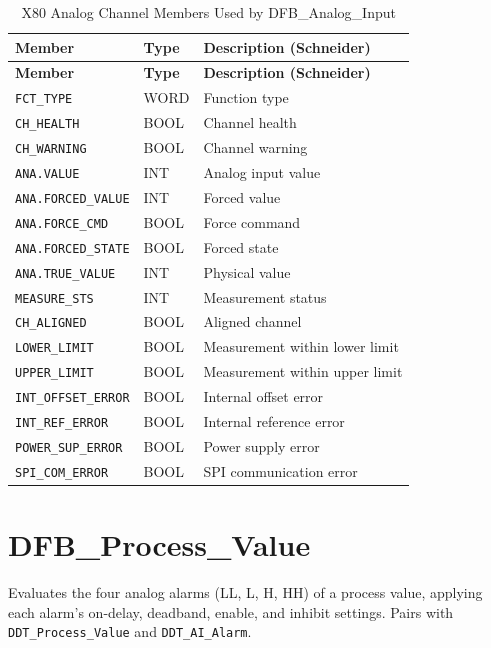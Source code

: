 \begin{longtable}{@{}P{4.97cm}P{2.38cm}P{9.58cm}@{}}
\caption{X80 Analog Channel Members Used by DFB\_Analog\_Input}\label{tab:dfb-ai-channel}\\
\toprule {}\textbf{Member} & \textbf{Type} & \textbf{Description (Schneider)}\\ \midrule
\endfirsthead
\toprule {}\textbf{Member} & \textbf{Type} & \textbf{Description (Schneider)}\\ \midrule
\endhead
\texttt{FCT\_TYPE} & WORD & Function type\\
\texttt{CH\_HEALTH} & BOOL & Channel health\\
\texttt{CH\_WARNING} & BOOL & Channel warning\\
\texttt{ANA.VALUE} & INT & Analog input value\\
\texttt{ANA.FORCED\_VALUE} & INT & Forced value\\
\texttt{ANA.FORCE\_CMD} & BOOL & Force command\\
\texttt{ANA.FORCED\_STATE} & BOOL & Forced state\\
\texttt{ANA.TRUE\_VALUE} & INT & Physical value\\
\texttt{MEASURE\_STS} & INT & Measurement status\\
\texttt{CH\_ALIGNED} & BOOL & Aligned channel\\
\texttt{LOWER\_LIMIT} & BOOL & Measurement within lower limit\\
\texttt{UPPER\_LIMIT} & BOOL & Measurement within upper limit\\
\texttt{INT\_OFFSET\_ERROR} & BOOL & Internal offset error\\
\texttt{INT\_REF\_ERROR} & BOOL & Internal reference error\\
\texttt{POWER\_SUP\_ERROR} & BOOL & Power supply error\\
\texttt{SPI\_COM\_ERROR} & BOOL & SPI communication error\\
\bottomrule
\end{longtable}

\section{DFB\_Process\_Value}
Evaluates the four analog alarms (LL, L, H, HH) of a process value, applying each alarm's on-delay, deadband, enable, and inhibit settings. Pairs with \texttt{DDT\_Process\_Value} and \texttt{DDT\_AI\_Alarm}.


